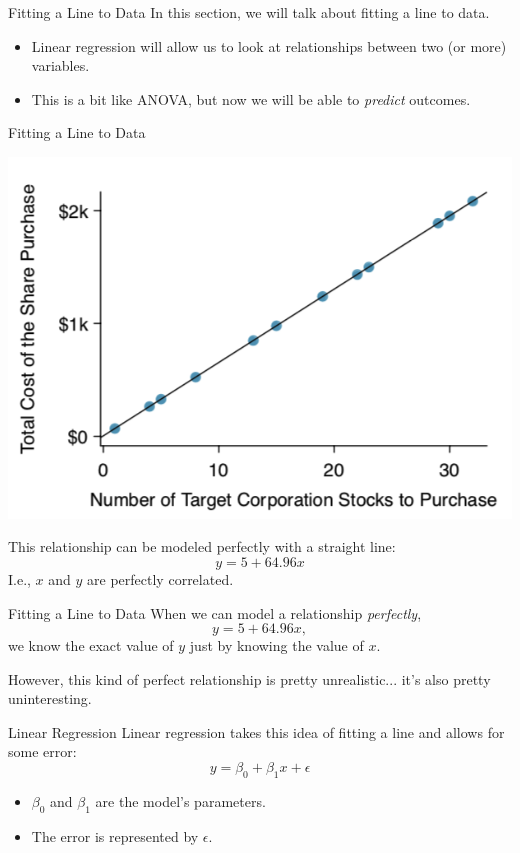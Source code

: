 \begin{frame}{Fitting a Line to Data}
    In this section, we will talk about fitting a line to data.
    \begin{itemize}
        \item Linear regression will allow us to look at relationships between two (or more) variables.
        \item This is a bit like ANOVA, but now we will be able to \textit{predict} outcomes.
    \end{itemize}
\end{frame}

\begin{frame}{Fitting a Line to Data}
    \begin{center}
        \includegraphics[scale=0.35]{images/perfectcorr.png}
    \end{center}
    This relationship can be modeled perfectly with a straight line:
    \[
        y = 5 + 64.96x
    \]
    I.e., $x$ and $y$ are perfectly correlated.
\end{frame}

\begin{frame}{Fitting a Line to Data}
    When we can model a relationship \textit{perfectly},
    \[
        y = 5 + 64.96x,
    \]
    we know the exact value of $y$ just by knowing the value of $x$.
    
    \vspace{12pt}However, this kind of perfect relationship is pretty unrealistic... it's also pretty uninteresting.
\end{frame}

\begin{frame}{Linear Regression}
    Linear regression takes this idea of fitting a line and allows for some error:
    \[
        y = \beta_0 + \beta_1 x + \epsilon
    \]
    \begin{itemize}
        \item $\beta_0$ and $\beta_1$ are the model's parameters.
        \item The error is represented by $\epsilon$.
    \end{itemize}
\end{frame}

